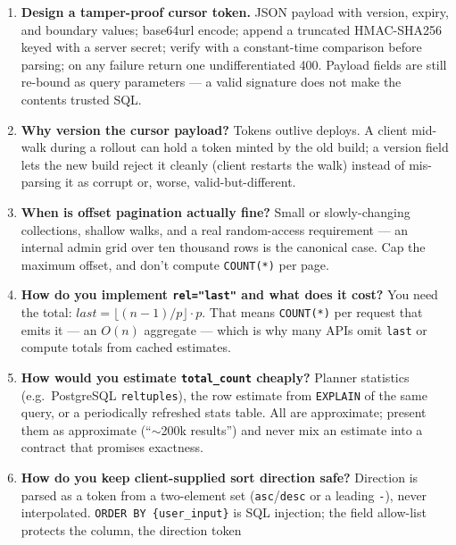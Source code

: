 \begin{enumerate}[label=\textbf{Q\arabic*.}, leftmargin=2.6em]
        is useless for it; \texttt{(cost)} alone forces a sort of ties.
        Verify with \texttt{EXPLAIN}: you want \texttt{SEARCH ... USING
        INDEX}, not \texttt{SCAN} or a temp B-tree.
  \item \textbf{Design a tamper-proof cursor token.}
        JSON payload with version, expiry, and boundary values; base64url
        encode; append a truncated HMAC-SHA256 keyed with a server secret;
        verify with a constant-time comparison before parsing; on any
        failure return one undifferentiated 400. Payload fields are still
        re-bound as query parameters --- a valid signature does not make
        the contents trusted SQL.
  \item \textbf{Why version the cursor payload?}
        Tokens outlive deploys. A client mid-walk during a rollout can hold
        a token minted by the old build; a version field lets the new build
        reject it cleanly (client restarts the walk) instead of
        mis-parsing it as corrupt or, worse, valid-but-different.
  \item \textbf{When is offset pagination actually fine?}
        Small or slowly-changing collections, shallow walks, and a real
        random-access requirement --- an internal admin grid over ten
        thousand rows is the canonical case. Cap the maximum offset, and
        don't compute \texttt{COUNT(*)} per page.
  \item \textbf{How do you implement \texttt{rel="last"} and what does it
        cost?}
        You need the total: $last = \lfloor (n-1)/p \rfloor \cdot p$.
        That means \texttt{COUNT(*)} per request that emits it --- an
        $O(n)$ aggregate --- which is why many APIs omit \texttt{last} or
        compute totals from cached estimates.
  \item \textbf{How would you estimate \texttt{total\_count} cheaply?}
        Planner statistics (e.g.\ PostgreSQL \texttt{reltuples}), the row
        estimate from \texttt{EXPLAIN} of the same query, or a
        periodically refreshed stats table. All are approximate; present
        them as approximate (``${\sim}$200k results'') and never mix an
        estimate into a contract that promises exactness.
  \item \textbf{How do you keep client-supplied sort direction safe?}
        Direction is parsed as a token from a two-element set
        (\texttt{asc}/\texttt{desc} or a leading \texttt{-}), never
        interpolated. \texttt{ORDER BY \{user\_input\}} is SQL injection;
        the field allow-list protects the column, the direction token

\end{enumerate}
